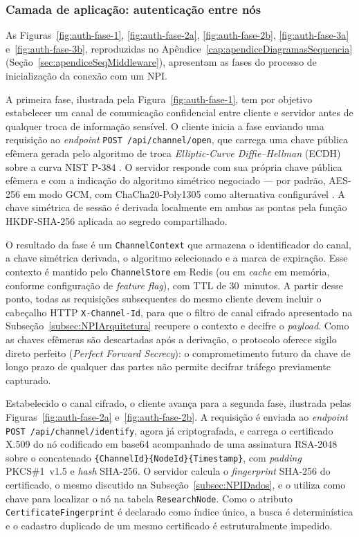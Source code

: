 \subsubsection{Camada de aplicação: autenticação entre nós}

As Figuras~\ref{fig:auth-fase-1}, \ref{fig:auth-fase-2a}, \ref{fig:auth-fase-2b}, \ref{fig:auth-fase-3a} e~\ref{fig:auth-fase-3b}, reproduzidas no Apêndice~\ref{cap:apendiceDiagramasSequencia} (Seção~\ref{sec:apendiceSeqMiddleware}), apresentam as fases do processo de inicialização da conexão com um NPI.

A primeira fase, ilustrada pela Figura~\ref{fig:auth-fase-1}, tem por objetivo estabelecer um canal de comunicação confidencial entre cliente e servidor antes de qualquer troca de informação sensível. O cliente inicia a fase enviando uma requisição ao \textit{endpoint} \texttt{POST /api/channel/open}, que carrega uma chave pública efêmera gerada pelo algoritmo de troca \textit{Elliptic-Curve Diffie--Hellman} (ECDH) sobre a curva NIST P-384 \cite{nistsp80056a, nistfips1865}. O servidor responde com sua própria chave pública efêmera e com a indicação do algoritmo simétrico negociado --- por padrão, AES-256 em modo GCM, com ChaCha20-Poly1305 como alternativa configurável \cite{nistfips197, nistsp80038d, rfc8439}. A chave simétrica de sessão é derivada localmente em ambas as pontas pela função HKDF-SHA-256 \cite{rfc5869} aplicada ao segredo compartilhado.

O resultado da fase é um \texttt{ChannelContext} que armazena o identificador do canal, a chave simétrica derivada, o algoritmo selecionado e a marca de expiração. Esse contexto é mantido pelo \texttt{ChannelStore} em Redis (ou em \textit{cache} em memória, conforme configuração de \textit{feature flag}), com TTL de 30~minutos. A partir desse ponto, todas as requisições subsequentes do mesmo cliente devem incluir o cabeçalho HTTP \texttt{X-Channel-Id}, para que o filtro de canal cifrado apresentado na Subseção~\ref{subsec:NPIArquitetura} recupere o contexto e decifre o \textit{payload}. Como as chaves efêmeras são descartadas após a derivação, o protocolo oferece sigilo direto perfeito (\textit{Perfect Forward Secrecy}): o comprometimento futuro da chave de longo prazo de qualquer das partes não permite decifrar tráfego previamente capturado.

Estabelecido o canal cifrado, o cliente avança para a segunda fase, ilustrada pelas Figuras~\ref{fig:auth-fase-2a} e~\ref{fig:auth-fase-2b}. A requisição é enviada ao \textit{endpoint} \texttt{POST /api/channel/identify}, agora já criptografada, e carrega o certificado X.509 do nó codificado em base64 acompanhado de uma assinatura RSA-2048 \cite{rfc8017} sobre o concatenado \texttt{\{ChannelId\}\{NodeId\}\{Timestamp\}}, com \textit{padding} PKCS\#1~v1.5 e \textit{hash} SHA-256. O servidor calcula o \textit{fingerprint} SHA-256 do certificado, o mesmo discutido na Subseção~\ref{subsec:NPIDados}, e o utiliza como chave para localizar o nó na tabela \texttt{ResearchNode}. Como o atributo \texttt{CertificateFingerprint} é declarado como índice único, a busca é determinística e o cadastro duplicado de um mesmo certificado é estruturalmente impedido.

